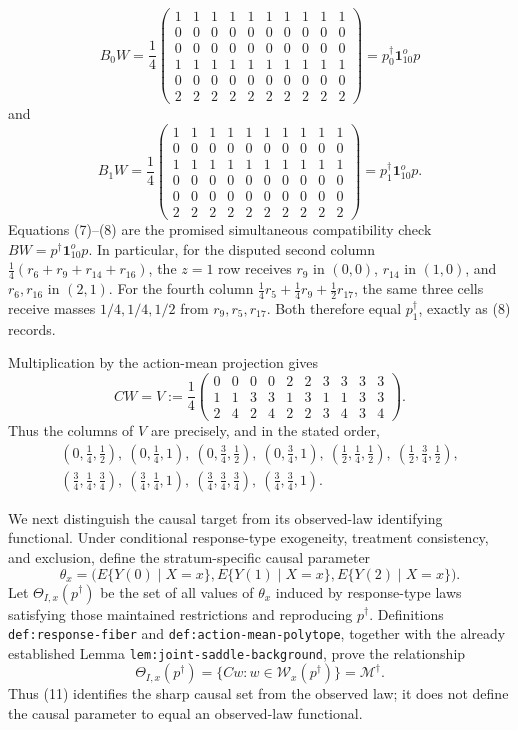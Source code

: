 \[
B_0W=\frac14
\begin{pmatrix}
1&1&1&1&1&1&1&1&1&1\\
0&0&0&0&0&0&0&0&0&0\\
0&0&0&0&0&0&0&0&0&0\\
1&1&1&1&1&1&1&1&1&1\\
0&0&0&0&0&0&0&0&0&0\\
2&2&2&2&2&2&2&2&2&2
\end{pmatrix}
=p_0^\dagger\mathbf 1_{10}^	op
\tag{7}
\]
and
\[
B_1W=\frac14
\begin{pmatrix}
1&1&1&1&1&1&1&1&1&1\\
0&0&0&0&0&0&0&0&0&0\\
1&1&1&1&1&1&1&1&1&1\\
0&0&0&0&0&0&0&0&0&0\\
0&0&0&0&0&0&0&0&0&0\\
2&2&2&2&2&2&2&2&2&2
\end{pmatrix}
=p_1^\dagger\mathbf 1_{10}^	op.
\tag{8}
\]
Equations (7)--(8) are the promised simultaneous compatibility check \(BW=p^\dagger\mathbf 1_{10}^	op\).  In particular, for the disputed second column \(\tfrac14(r_6+r_9+r_{14}+r_{16})\), the \(z=1\) row receives \(r_9\) in \((0,0)\), \(r_{14}\) in \((1,0)\), and \(r_6,r_{16}\) in \((2,1)\).  For the fourth column \(\tfrac14r_5+\tfrac14r_9+\tfrac12r_{17}\), the same three cells receive masses \(1/4,1/4,1/2\) from \(r_9,r_5,r_{17}\).  Both therefore equal \(p_1^\dagger\), exactly as (8) records.

Multiplication by the action-mean projection gives
\[
CW=V:=\frac14
\begin{pmatrix}
0&0&0&0&2&2&3&3&3&3\\
1&1&3&3&1&3&1&1&3&3\\
2&4&2&4&2&2&3&4&3&4
\end{pmatrix}.
\tag{9}
\]
Thus the columns of \(V\) are precisely, and in the stated order,
\[
\begin{gathered}
(0,\tfrac14,\tfrac12),\ (0,\tfrac14,1),\ (0,\tfrac34,\tfrac12),\ (0,\tfrac34,1),\
(\tfrac12,\tfrac14,\tfrac12),\ (\tfrac12,\tfrac34,\tfrac12),\\
(\tfrac34,\tfrac14,\tfrac34),\ (\tfrac34,\tfrac14,1),\
(\tfrac34,\tfrac34,\tfrac34),\ (\tfrac34,\tfrac34,1).
\end{gathered}
\tag{10}
\]

We next distinguish the causal target from its observed-law identifying functional.  Under conditional response-type exogeneity, treatment consistency, and exclusion, define the stratum-specific causal parameter
\[
 \theta_x=\bigl(E\{Y(0)\mid X=x\},E\{Y(1)\mid X=x\},E\{Y(2)\mid X=x\}\bigr).
\]
Let \(\Theta_{I,x}(p^\dagger)\) be the set of all values of \(\theta_x\) induced by response-type laws satisfying those maintained restrictions and reproducing \(p^\dagger\).  Definitions \texttt{def:response-fiber} and \texttt{def:action-mean-polytope}, together with the already established Lemma \texttt{lem:joint-saddle-background}, prove the relationship
\[
 \Theta_{I,x}(p^\dagger)
 =\{Cw:w\in\mathcal W_x(p^\dagger)\}
 =\mathcal M^\dagger.
 \tag{11}
\]
Thus (11) identifies the sharp causal set from the observed law; it does not define the causal parameter to equal an observed-law functional.

